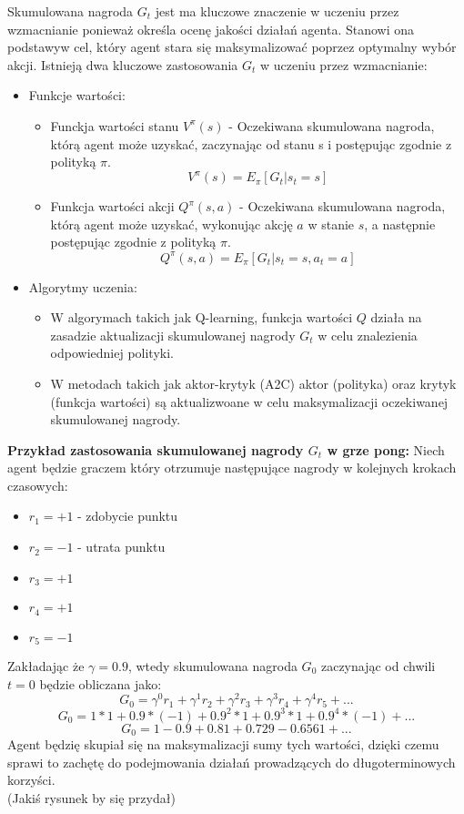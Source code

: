 \documentclass[a4paper, 10pt]{article}
\begin{document}
    Skumulowana nagroda \( G_t \) jest ma kluczowe znaczenie w uczeniu przez wzmacnianie ponieważ określa ocenę jakości działań agenta. Stanowi ona podstawyw cel, który agent stara się 
    maksymalizować poprzez optymalny wybór akcji. Istnieją dwa kluczowe zastosowania \( G_t \) w uczeniu przez wzmacnianie:
    \begin{itemize}
        \item Funkcje wartości:
        \begin{itemize}
            \item Funckja wartości stanu \( V^\pi(s) \) - Oczekiwana skumulowana nagroda, którą agent może uzyskać, zaczynając od stanu s i postępując zgodnie z polityką \( \pi \).
            \[ V^\pi(s) = E_\pi[G_t|s_t=s] \]
            \item Funkcja wartości akcji \( Q^\pi(s,a) \) - Oczekiwana skumulowana nagroda, którą agent może uzyskać, wykonując akcję \( a \) w stanie \( s \),
            a następnie postępując zgodnie z polityką \( \pi \).
            \[ Q^\pi(s,a) = E_\pi[G_t|s_t=s,a_t=a] \]
        \end{itemize}
        \item Algorytmy uczenia:
        \begin{itemize}
            \item W algorymach takich jak Q-learning, funkcja wartości \( Q \) działa na zasadzie aktualizacji skumulowanej nagrody \( G_t \) w celu znalezienia odpowiedniej polityki.
            \item W metodach takich jak aktor-krytyk (A2C) aktor (polityka) oraz krytyk (funkcja wartości) są aktualizwoane w celu maksymalizacji oczekiwanej skumulowanej nagrody.
        \end{itemize}
    \end{itemize}
    \textbf{Przykład zastosowania skumulowanej nagrody \( G_t \) w grze pong:}
    Niech agent będzie graczem który otrzumuje następujące nagrody w kolejnych krokach czasowych:
    \begin{itemize}
        \item \( r_1 = +1 \) - zdobycie punktu
        \item \( r_2 = -1 \) - utrata punktu
        \item \( r_3 = +1 \)
        \item \( r_4 = +1 \)
        \item \( r_5 = -1 \)
    \end{itemize}
    Zakładając że \( \gamma = 0.9 \), wtedy skumulowana nagroda \( G_0 \) zaczynając od chwili \( t = 0 \) będzie obliczana jako:
    \[ G_0 = \gamma^0r_1 + \gamma^1r_2 + \gamma^2r_3 + \gamma^3r_4 + \gamma^4r_5 + ... \]
    \[ G_0 = 1 * 1 + 0.9 * (-1) + 0.9^2 * 1 + 0.9^3 * 1 + 0.9^4 * (-1) + ... \]
    \[ G_0 = 1 - 0.9 + 0.81 + 0.729 - 0.6561 + ... \]
    Agent będzię skupiał się na maksymalizacji sumy tych wartości, dzięki czemu sprawi to zachętę do podejmowania działań prowadzących do długoterminowych korzyści. \\
    (Jakiś rysunek by się przydał)
\end{document}
